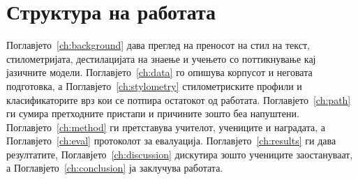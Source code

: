 \section{Структура на работата}

Поглавјето~\ref{ch:background} дава преглед на преносот на стил на текст,
стилометријата, дестилацијата на знаење и учењето со поттикнување кај
јазичните модели. Поглавјето~\ref{ch:data} го опишува корпусот и неговата
подготовка, а Поглавјето~\ref{ch:stylometry} стилометриските профили и
класификаторите врз кои се потпира остатокот од работата.
Поглавјето~\ref{ch:path} ги сумира претходните пристапи и причините зошто
беа напуштени. Поглавјето~\ref{ch:method} ги претставува учителот,
учениците и наградата, а Поглавјето~\ref{ch:eval} протоколот за
евалуација. Поглавјето~\ref{ch:results} ги дава резултатите,
Поглавјето~\ref{ch:discussion} дискутира зошто учениците заостануваат, а
Поглавјето~\ref{ch:conclusion} ја заклучува работата.
